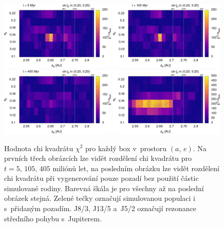 \documentclass[A4paper, 12pt, oneside]{book}
\begin{document}
\immediate{}
\immediate{}
\immediate{}
\immediate{}
\begin{figure}
	\centering
	\includegraphics[width=0.49\textwidth]{obr/ae_chi_0006t.png}
	\includegraphics[width=0.49\textwidth]{obr/ae_chi_0106t.png}\\
	\includegraphics[width=0.49\textwidth]{obr/ae_chi_0406t.png}
	\includegraphics[width=0.49\textwidth]{obr/ae_chi_emptyt.png}
	\caption{Hodnota chi kvadrátu $\chi^2$ pro každý box v~prostoru $(a,\,e)$. Na prvních třech obrázcích lze vidět rozdělení chi kvadrátu pro $t=5,\,105,\,405$ miliónů let, na posledním obrázku lze vidět rozdělení chi kvadrátu při vygenerování pouze pozadí bez použití částic simulované rodiny. Barevná škála je pro všechny až na poslední obrázek stejná. Zelené tečky označují simulovanou populaci i s~přidaným pozadím. J8/3, J13/5 a~J5/2 označují rezonance středního pohybu s~Jupiterem.} \label{fig:ae_chi2}
\end{figure}
\end{document}
